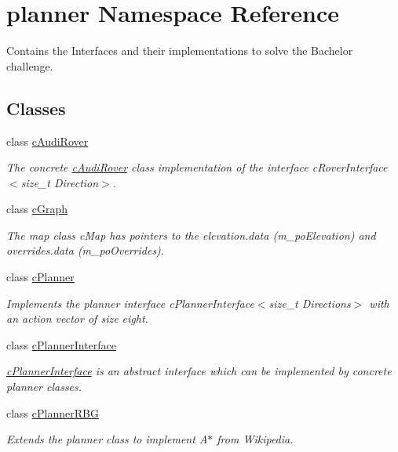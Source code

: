 \hypertarget{namespaceplanner}{}\section{planner Namespace Reference}
\label{namespaceplanner}


Contains the Interfaces and their implementations to solve the Bachelor challenge.  


\subsection*{Classes}
\begin{DoxyCompactItemize}
\item 
class \mbox{\hyperlink{classplanner_1_1c_audi_rover}{c\+Audi\+Rover}}
\begin{DoxyCompactList}\small\item\em The concrete \mbox{\hyperlink{classplanner_1_1c_audi_rover}{c\+Audi\+Rover}} class implementation of the interface c\+Rover\+Interface$<$size\+\_\+t Direction$>$. \end{DoxyCompactList}\item 
class \mbox{\hyperlink{classplanner_1_1c_graph}{c\+Graph}}
\begin{DoxyCompactList}\small\item\em The map class c\+Map has pointers to the elevation.\+data (m\+\_\+po\+Elevation) and overrides.\+data (m\+\_\+po\+Overrides). \end{DoxyCompactList}\item 
class \mbox{\hyperlink{classplanner_1_1c_planner}{c\+Planner}}
\begin{DoxyCompactList}\small\item\em Implements the planner interface c\+Planner\+Interface$<$size\+\_\+t Directions$>$ with an action vector of size eight. \end{DoxyCompactList}\item 
class \mbox{\hyperlink{classplanner_1_1c_planner_interface}{c\+Planner\+Interface}}
\begin{DoxyCompactList}\small\item\em \mbox{\hyperlink{classplanner_1_1c_planner_interface}{c\+Planner\+Interface}} is an abstract interface which can be implemented by concrete planner classes. \end{DoxyCompactList}\item 
class \mbox{\hyperlink{classplanner_1_1c_planner_r_b_g}{c\+Planner\+R\+BG}}
\begin{DoxyCompactList}\small\item\em Extends the planner class to implement A$\ast$ from Wikipedia. \end{DoxyCompactList}\item 

\end{DoxyCompactItemize}
